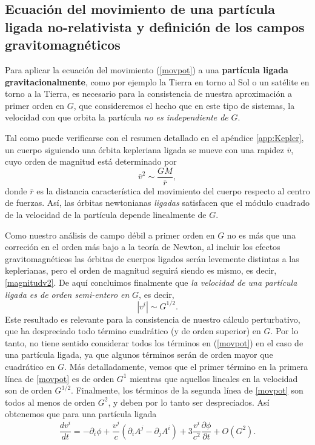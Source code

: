 \subsection{Ecuación del movimiento de una partícula ligada no-relativista y definición de los campos gravitomagnéticos}

Para aplicar la ecuación del movimiento (\ref{movpot}) a una \textbf{partícula ligada gravitacionalmente}, como por ejemplo la Tierra en torno al Sol o un satélite en torno a la Tierra, es necesario para la consistencia de nuestra aproximación a primer orden en $G$, que consideremos el hecho que en este tipo de sistemas, la velocidad con que orbita la partícula \textit{no es independiente de} $G$.

Tal como puede verificarse con el resumen detallado en el apéndice \ref{app:Kepler}, un cuerpo siguiendo una órbita kepleriana ligada se mueve con una rapidez $\bar{v}$, cuyo orden de magnitud está determinado por
\begin{equation}
\bar{v}^2\sim\frac{GM}{\bar{r}},\label{magnitudv2}
\end{equation}
donde $\bar{r}$ es la distancia característica del movimiento del cuerpo respecto al centro de fuerzas. Así, las órbitas newtonianas \textit{ligadas} satisfacen que el módulo cuadrado de la velocidad de la partícula depende linealmente de $G$.

Como nuestro análisis de campo débil a primer orden en $G$ no es más que una correción en el orden más bajo a la teoría de Newton, al incluir los efectos gravitomagnéticos las órbitas de cuerpos ligados serán levemente distintas a las keplerianas, pero el orden de magnitud seguirá siendo es mismo, es decir, \eqref{magnitudv2}.
De aquí concluimos finalmente que\textit{ la velocidad de una partícula ligada es de orden semi-entero en} $G$, es decir,
\begin{equation}\boxed{
|v^i|\sim G^{1/2}.}\label{gfrac}
\end{equation}
Este resultado es relevante para la consistencia de nuestro cálculo perturbativo, que ha despreciado todo término cuadrático (y de orden superior) en $G$. Por lo tanto, no tiene sentido considerar todos los términos en (\ref{movpot}) en el caso de una partícula ligada, ya que algunos términos serán de orden mayor que cuadrático en $G$. Más detalladamente, vemos que el primer término en la primera línea de \eqref{movpot} es de orden $G^1$ mientras que aquellos lineales en la velocidad son de orden $G^{3/2}$. Finalmente, los términos de la segunda línea de \eqref{movpot} son todos al menos de orden $G^2$, y deben por lo tanto ser despreciados. Así obtenemos que para una partícula ligada 
\begin{equation}
\frac{dv^{i}}{dt}=-\partial_i\phi+\frac{v^j}{c}(\partial_iA^{j}-\partial_jA^{i})+3\frac{v^i}{c^2}\frac{\partial \phi}{\partial t}+O\left(G^2\right).\label{movnorel}
\end{equation}

